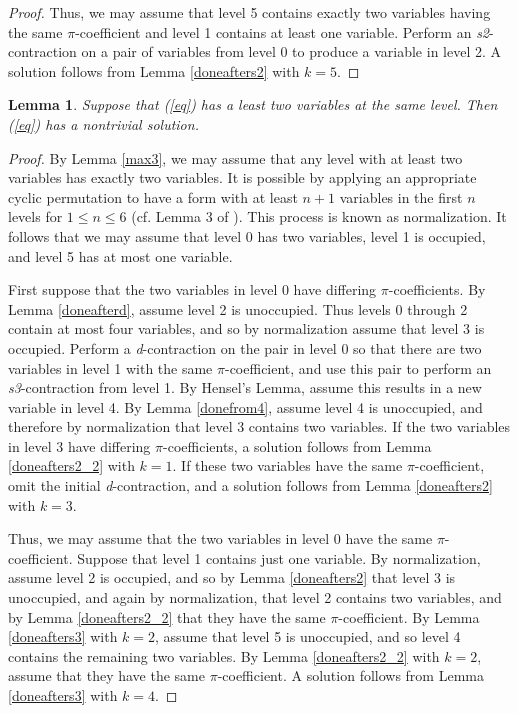 \documentclass[draft]{publmathdeb}
\newtheorem{lemma}{Lemma}
\begin{document}
\begin{proof}
Thus, we may assume that level 5 contains exactly two variables having the same $\pi$-coefficient and level 1 contains at least one variable.  Perform an \textit{s2}-contraction on a pair of variables from level 0 to produce a variable in level 2.  A solution follows from Lemma \ref{doneafters2} with $k=5$.
\end{proof}

\begin{lemma}\label{max2}
Suppose that (\ref{eq}) has a least two variables at the same level.  Then (\ref{eq}) has a nontrivial solution.
\end{lemma}
\begin{proof}

By Lemma \ref{max3}, we may assume that any level with at least two variables has exactly two variables.  It is possible by applying an appropriate cyclic permutation to have a form with at least $n+1$ variables in the first $n$ levels for $1 \le n \le 6$  (cf. Lemma 3 of \cite{knapp2016solubility}).  This process is known as normalization.  It follows that we may assume that level 0 has two variables, level 1 is occupied, and level 5 has at most one variable.

First suppose that the two variables in level 0 have differing $\pi$-coefficients.  By Lemma \ref{doneafterd}, assume level 2 is unoccupied.  Thus levels 0 through 2 contain at most four variables, and so by normalization assume that level 3 is occupied.  Perform a \textit{d}-contraction on the pair in level 0 so that there are two variables in level 1 with the same $\pi$-coefficient, and use this pair to perform an \textit{s3}-contraction from level 1.  By Hensel's Lemma, assume this results in a new variable in level 4.  By Lemma \ref{donefrom4}, assume level 4 is unoccupied, and therefore by normalization that level 3 contains two variables.  If the two variables in level 3 have differing $\pi$-coefficients, a solution follows from Lemma \ref{doneafters2_2} with $k=1$.  If these two variables have the same $\pi$-coefficient, omit the initial \textit{d}-contraction, and a solution follows from Lemma \ref{doneafters2} with $k=3$.

Thus, we may assume that the two variables in level 0 have the same $\pi$-coefficient.  Suppose that level 1 contains just one variable.  By normalization, assume level 2 is occupied, and so by Lemma \ref{doneafters2} that level 3 is unoccupied, and again by normalization, that level 2 contains two variables, and by Lemma \ref{doneafters2_2} that they have the same $\pi$-coefficient.  By Lemma \ref{doneafters3} with $k=2$, assume that level 5 is unoccupied, and so level 4 contains the remaining two variables.  By Lemma \ref{doneafters2_2} with $k=2$, assume that they have the same $\pi$-coefficient.  A solution follows from Lemma \ref{doneafters3} with $k=4$.


\end{proof}
\end{document}
